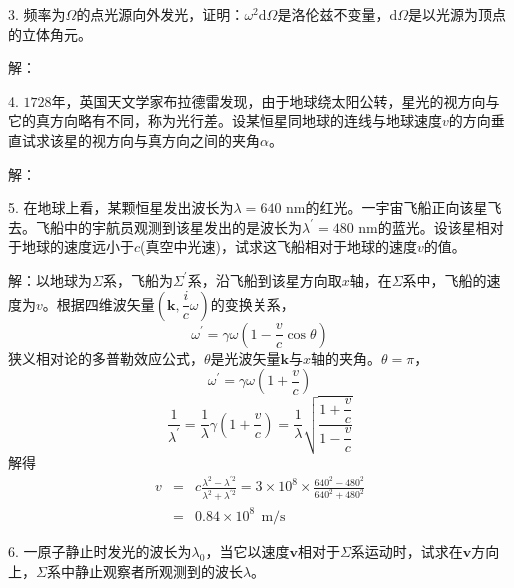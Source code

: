 \documentclass[12pt,a4paper]{article}
\renewcommand{\vec}[1]{\boldsymbol{#1}}
\newcommand{\dif}{\mathrm{d}}
\begin{document}
3. 频率为$\Omega$的点光源向外发光，证明：$\omega^2 \dif \Omega$是洛伦兹不变量，$\dif \Omega$是以光源为顶点的立体角元。

解：



4. $1728$年，英国天文学家布拉德雷发现，由于地球绕太阳公转，星光的视方向与它的真方向略有不同，称为光行差。设某恒星同地球的连线与地球速度$v$的方向垂直试求该星的视方向与真方向之间的夹角$\alpha$。

解：



5. 在地球上看，某颗恒星发出波长为$\lambda = 640$ nm的红光。一宇宙飞船正向该星飞去。飞船中的宇航员观测到该星发出的是波长为$\lambda^{\prime} = 480$ nm的蓝光。设该星相对于地球的速度远小于$c$(真空中光速)，试求这飞船相对于地球的速度$v$的值。

解：以地球为$\Sigma$系，飞船为$\Sigma^{\prime}$系，沿飞船到该星方向取$x$轴，在$\Sigma$系中，飞船的速度为$v$。根据四维波矢量$(\vec{k}, \dfrac{i}{c}\omega)$的变换关系，
\begin{equation*}
\omega^{\prime} = \gamma \omega \left(1-\frac{v}{c} \cos \theta \right)
\end{equation*}
狭义相对论的多普勒效应公式，$\theta$是光波矢量$\vec{k}$与$x$轴的夹角。$\theta = \pi$，
\begin{equation*}
\omega^{\prime} = \gamma \omega \left(1+\frac{v}{c} \right)
\end{equation*}
\begin{equation*}
\frac{1}{\lambda^{\prime} } = \frac{1}{\lambda} \gamma \left(1+\frac{v}{c} \right) = \frac{1}{\lambda} \sqrt{\frac{1+\dfrac{v}{c}}{1-\dfrac{v}{c}}}
\end{equation*}
解得
\begin{eqnarray*}
v &=& c \frac{\lambda^2 -\lambda^{\prime 2}}{\lambda^2 +\lambda^{\prime 2}} = 3\times 10^8 \times \frac{640^2 -480^2}{640^2 +480^2} \\
&=& 0.84 \times 10^8 ~~\text{m/s}
\end{eqnarray*}


6. 一原子静止时发光的波长为$\lambda_0$，当它以速度$\vec{v}$相对于$\Sigma$系运动时，试求在$\vec{v}$方向上，$\Sigma$系中静止观察者所观测到的波长$\lambda$。
\end{document}

